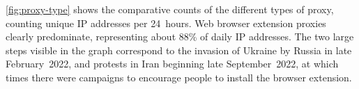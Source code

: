 \documentclass[letterpaper,twocolumn]{article}
\begin{document}
\autoref{fig:proxy-type} shows the
comparative counts of the different types of proxy,
counting unique IP addresses per 24~hours.
Web browser extension proxies clearly predominate,
representing about 88\% of daily IP addresses.
The two large steps visible in the graph correspond
to the invasion of Ukraine by Russia in late February~2022,
and protests in Iran beginning late September~2022,
at which times there were campaigns
to encourage people to install the browser extension.
\end{document}
